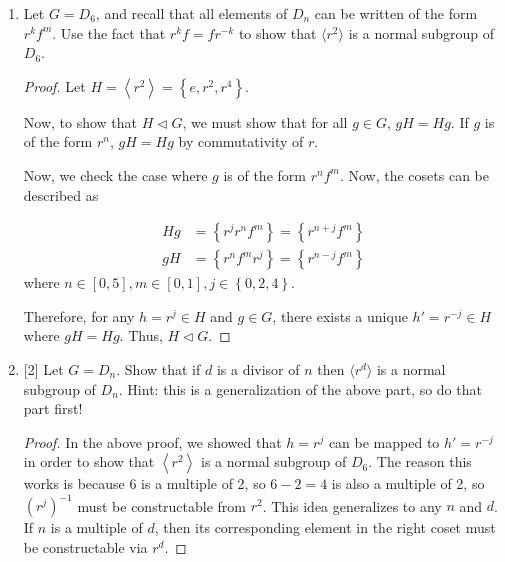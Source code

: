 \documentclass{article}
\newcommand{\set}[1]{\left\{#1\right\}}
\newcommand{\ang}[1]{\left\langle #1 \right\rangle}
\newcommand{\normsub}{\lhd}
\begin{document}
\begin{enumerate}
{\begin{enumerate}
{\begin{proof}
                    Next, to see \(G \normsub G\), notice that for all \(g \in G\), 
                    the coset \(gG\) is just the set of \(G\). Similarly, \(Gg = G\).
                    Therfore, \(gG = Gg\) and \(G \normsub G\).
                \end{proof}
            }

            \item {
                Let \(G = D_6\), and recall that all elements of \(D_n\) can be written of the form \(r^k f^m\). Use the fact that \(r^kf = fr^{-k}\) to show that \(\langle r^2 \rangle\) is a normal subgroup of \(D_6\).
    
                \begin{proof}
                    Let \(H = \ang{r^2} = \set{e, r^2, r^4}\).

                    Now, to show that \(H \normsub G\), we must show that 
                    for all \(g \in G\), \(gH = Hg\). If \(g\) is of the form \(r^n\),
                    \(gH = Hg\) by commutativity of \(r\). 
                    
                    Now, we check the case where \(g\) is of the form \(r^n f^m\).
                    Now, the cosets can be described as
                    
                    \begin{align}
                        Hg &= \set{r^j r^n f^m} = \set{r^{n+j} f^m}\\
                        gH &= \set{r^n f^m r^j} = \set{r^{n-j} f^m}
                    \end{align}
                    where \(n \in [0,5], m \in [0,1], j \in \set{0,2,4}\).

                    Therefore, for any \(h = r^j \in H\) and \(g \in G\), there 
                    exists a unique \(h' = r^{-j} \in H\) where \(gH = Hg\).
                    Thus, \(H \normsub G\).
                \end{proof}
            }

            \item {
                [2] Let \(G = D_n\). Show that if \(d\) is a divisor of \(n\) then \(\langle r^d \rangle\) is a normal subgroup of \(D_n\). Hint: this is a generalization of the above part, so do that part first!
    
                \begin{proof}
                    In the above proof, we showed that \(h = r^j\) can be mapped 
                    to \(h' = r^{-j}\) in order to show that \(\ang{r^2}\) is a 
                    normal subgroup of \(D_6\). The reason this works is because 
                    6 is a multiple of 2, so \(6 - 2 = 4\) is also a multiple of 
                    2, so \((r^j)^{-1}\) must be constructable from \(r^2\). This 
                    idea generalizes to any \(n\) and \(d\). If \(n\) is a multiple 
                    of \(d\), then its corresponding element in the right coset 
                    must be constructable via \(r^d\).
                \end{proof}
            }


\end{enumerate}}
\end{enumerate}
\end{document}
